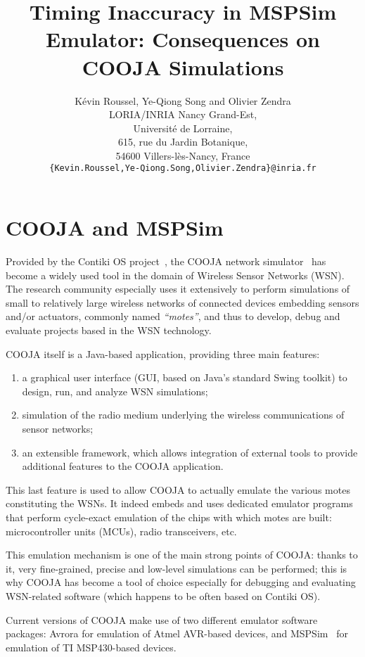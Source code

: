 \documentclass[a4paper,10pt]{article}
\title{Timing Inaccuracy in MSPSim Emulator: Consequences on COOJA Simulations}
\author{
K\'evin Roussel, Ye-Qiong Song and Olivier Zendra\\
LORIA/INRIA Nancy Grand-Est,\\
Universit\'e de Lorraine,\\
615, rue du Jardin Botanique,\\
54600 Villers-l\`es-Nancy, France\\
\texttt{\{Kevin.Roussel,Ye-Qiong.Song,Olivier.Zendra\}@inria.fr}
}
\date{}
\begin{document}
\maketitle




\section{COOJA and MSPSim}

Provided by the Contiki OS project~\cite{ContikiOS}, the COOJA network
simulator~\cite{Cooja} has become a widely used tool in the domain of
Wireless Sensor Networks (WSN). The research community especially uses
it extensively to perform simulations of small to relatively large wireless
networks of connected devices embedding sensors and/or actuators, commonly
named \emph{``motes''}, and thus to develop, debug and evaluate projects
based in the WSN technology.

COOJA itself is a Java-based application, providing three main features:
\begin{enumerate}
\item a graphical user interface (GUI, based on Java's standard Swing toolkit)
to design, run, and analyze WSN simulations;
\item simulation of the radio medium underlying the wireless communications
of sensor networks;
\item an extensible framework, which allows integration of external tools
to provide additional features to the COOJA application.
\end{enumerate}
This last feature is used to allow COOJA to actually emulate the various
motes constituting the WSNs. It indeed embeds and uses dedicated emulator
programs that perform cycle-exact emulation of the chips with which motes
are built: microcontroller units (MCUs), radio transceivers, etc.

This emulation mechanism is one of the main strong points of COOJA:
thanks to it, very fine-grained, precise and low-level simulations
can be performed; this is why COOJA has become a tool of choice especially
for debugging and evaluating WSN-related software (which happens to be
often based on Contiki OS).

Current versions of COOJA make use of two different emulator software
packages: Avrora for emulation of Atmel AVR-based devices, and
MSPSim~\cite{MSPSim} for emulation of TI MSP430-based devices.
\end{document}
